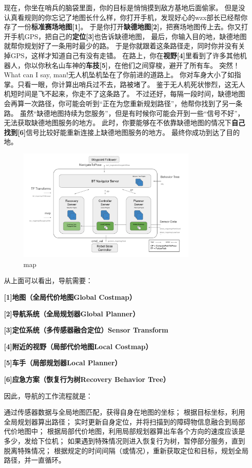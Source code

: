 现在，你坐在哨兵的脑袋里面，你的目标是悄悄摸到敌方基地后面偷家。
但是没认真看规则的你忘记了地图长什么样，你打开手机，发现好心的wzx部长已经帮你存了一份\textbf{标准赛场地图[1]}。
于是你打开\textbf{缺德地图[2]}，把赛场地图传上去。你又打开手机GPS，把自己的\textbf{定位[3]}也告诉缺德地图，
最后，你输入目的地，缺德地图就帮你规划好了一条用时最少的路。
于是你就跟着这条路径走，同时你并没有关掉GPS，这样才知道自己有没有走错。
在路上，你在\textbf{视野[4]}里看到了许多其他机器人，你以你秋名山车神的\textbf{车技[5]}，在他们之间穿梭，避开了所有车。
突然！What can I say, man!无人机坠机坠在了你前进的道路上。
你对车身大小了如指掌。只看一眼，你计算出哨兵过不去，路被堵了。
鉴于无人机死状惨烈，这无人机短时间是飞不起来，你走不了这条路了。
不过还好，每隔一段时间，缺德地图会再算一次路径，你可能会听到“正在为您重新规划路径”，他帮你找到了另一条路。
虽然“缺德地图持续为您服务”，但是有时候你可能会开到一些“信号不好”，无法获取缺德地图服务的地方。
此时，你要能够在不依靠缺德地图的情况下\textbf{自己找到[6]}信号比较好能重新连接上缺德地图服务的地方。
最终你成功到达了目的地。

\begin{figure}[H]
    \centering
    \includegraphics[width=0.8\textwidth]{./images/Nav2导航框架.png}
    \caption{map}
    \end{figure}
从上面可以看出，导航需要：

\textbf{[1]地图（全局代价地图Global Costmap）}

\textbf{[2]导航系统（全局规划器Global Planner）}

\textbf{[3]定位系统（多传感器融合定位）Sensor Transform}

\textbf{[4]附近的视野（局部代价地图Local Costmap）}

\textbf{[5]车手（局部规划器Local Planner）}

\textbf{[6]应急方案（恢复行为树Recovery Behavior Tree）}

因此，导航的工作流程就是：

通过传感器数据与全局地图匹配，获得自身在地图的坐标；
根据目标坐标，利用全局规划器算出路径；
实时更新自身定位，并将扫描到的障碍物信息融合到局部代价地图中；
根据局部代价地图，利用局部规划器算出车各个方向的速度应该是多少，发给下位机；
如果遇到特殊情况则进入恢复行为树，暂停部分服务，直到脱离特殊情况；
根据规定的时间间隔（或情况），重新获取定位和目标，规划全局路径，并一直循环。